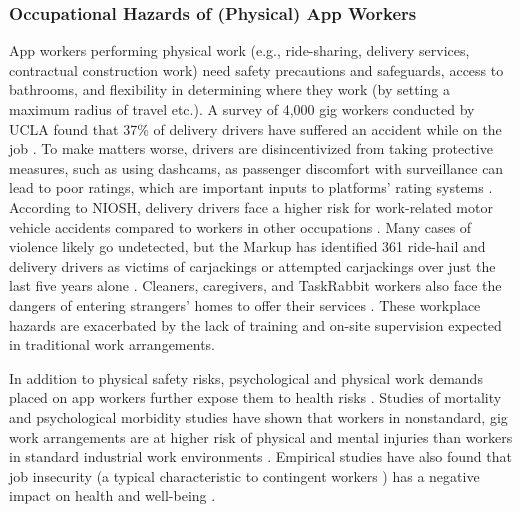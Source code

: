\subsubsection{Occupational Hazards of (Physical) App Workers}
App workers performing physical work (e.g., ride-sharing, delivery services, contractual construction work) need safety precautions and safeguards, access to bathrooms, and flexibility in determining where they work (by setting a maximum radius of travel etc.). A survey of 4,000 gig workers conducted by UCLA found that 37\% of delivery drivers have suffered an accident while on the job \cite{noauthor_undated-is}. To make matters worse, drivers are disincentivized from taking protective measures, such as using dashcams, as passenger discomfort with surveillance can lead to poor ratings, which are important inputs to platforms' rating systems \cite{Almoqbel2019-in}. According to NIOSH, delivery drivers face a higher risk for work-related motor vehicle accidents compared to workers in other occupations \cite{noauthor_1998-ts}. Many cases of violence likely go undetected, but the Markup has identified 361 ride-hail and delivery drivers as victims of carjackings or attempted carjackings over just the last five years alone \cite{Kerr_undated-zw}. Cleaners, caregivers, and TaskRabbit workers also face the dangers of entering strangers' homes to offer their services \cite{Bajwa2018-gy}. These workplace hazards are exacerbated by the lack of training and on-site supervision expected in traditional work arrangements.

In addition to physical safety risks, psychological and physical work demands placed on app workers further expose them to health risks \cite{Keith2020-zb}. Studies of mortality and psychological morbidity studies have shown that workers in nonstandard, gig work arrangements are at higher risk of physical and mental injuries than workers in standard industrial work environments \cite{Howard2017-wd}. Empirical studies have also found that job insecurity (a typical characteristic to contingent workers ) has a negative impact on health and well-being \cite{De_witte2016-wz}.

